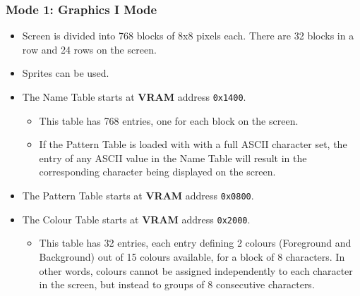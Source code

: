         \subsubsection{Mode 1: \textbf{Graphics I Mode}}
        \begin{itemize}
            \item Screen is divided into 768 blocks of 8x8 pixels each. There
                are 32 blocks in a row and 24 rows on the screen.
            \item Sprites can be used.
            \item The Name Table starts at \textbf{VRAM} address \texttt{0x1400}.
            \begin{itemize}
                \item This table has 768 entries, one for each block on the screen.
                \item If the Pattern Table is loaded with with a full ASCII
                    character set, the entry of any ASCII value in the Name
                    Table will result in the corresponding character being
                    displayed on the screen.
            \end{itemize}
            \item The Pattern Table starts at \textbf{VRAM} address \texttt{0x0800}.
            \item The Colour Table starts at \textbf{VRAM} address \texttt{0x2000}.
            \begin{itemize}
                \item This table has 32 entries, each entry defining 2 colours
                (Foreground and Background) out of 15 colours available, for a
                block of 8 characters. In other words, colours cannot be
                assigned independently to each character in the screen, but
                instead to groups of 8 consecutive characters.
            \end{itemize}
        \end{itemize}

